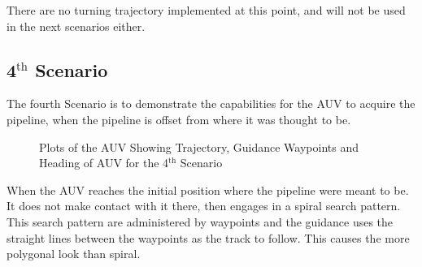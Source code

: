 		There are no turning trajectory implemented at this point, and will not be used in
		the next scenarios either.
		
	
	
	\subsection{4$^{\mathrm{th}}$ Scenario}
		The fourth Scenario is to demonstrate the capabilities for the AUV to acquire the pipeline,
		when the pipeline is offset from where it was thought to be. 
		
		\begin{figure}[htbp]
			\centering
			\caption[Trajectory plots for the 4th scenario]{Plots of the AUV Showing Trajectory, 
			Guidance Waypoints and Heading of AUV for the 4$^{\mathrm{th}}$ Scenario}
			\label{fig:ch3_4th_NE_plots}
		\end{figure}
		When the AUV reaches the initial position where the pipeline were meant to be. It does not
		make
		contact with it there, then engages in a spiral search pattern. This search pattern are
		administered by waypoints and the guidance uses the straight lines between the waypoints as
		the track to follow. This causes the more polygonal look than spiral. 
			
